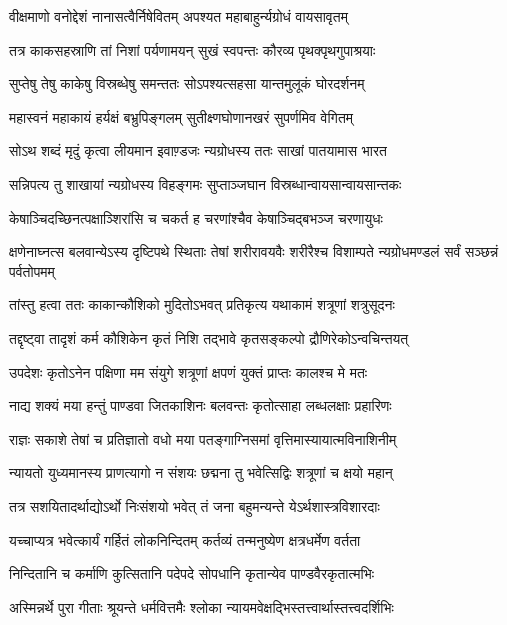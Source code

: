 \twolineshloka
{वीक्षमाणो वनोद्देशं नानासत्वैर्निषेवितम्}
{अपश्यत महाबाहुर्न्यग्रोधं वायसावृतम्}


\twolineshloka
{तत्र काकसहस्राणि तां निशां पर्यणामयन्}
{सुखं स्वपन्तः कौरव्य पृथक्पृथगुपाश्रयाः}


\twolineshloka
{सुप्तेषु तेषु काकेषु विस्रब्धेषु समन्ततः}
{सोऽपश्यत्सहसा यान्तमुलूकं घोरदर्शनम्}


\twolineshloka
{महास्वनं महाकायं हर्यक्षं बभ्रुपिङ्गलम्}
{सुतीक्ष्णघोणानखरं सुपर्णमिव वेगितम्}


\twolineshloka
{सोऽथ शब्दं मृदुं कृत्वा लीयमान इवाण़्डजः}
{न्यग्रोधस्य ततः साखां पातयामास भारत}


\twolineshloka
{सन्निपत्य तु शाखायां न्यग्रोधस्य विहङ्गमः}
{सुप्ताञ्जघान विस्रब्धान्वायसान्वायसान्तकः}


\twolineshloka
{केषाञ्चिदच्छिनत्पक्षाञ्शिरांसि च चकर्त ह}
{चरणांश्चैव केषाञ्चिद्बभञ्ज चरणायुधः}


क्षणेनाघ्नत्स बलवान्येऽस्य दृष्टिपथे स्थिताः
\twolineshloka
{तेषां शरीरावयवैः शरीरैश्च विशाम्पते}
{न्यग्रोधमण्डलं सर्वं सञ्छन्नं पर्वतोपमम्}


\twolineshloka
{तांस्तु हत्वा ततः काकान्कौशिको मुदितोऽभवत्}
{प्रतिकृत्य यथाकामं शत्रूणां शत्रुसूदनः}


\twolineshloka
{तद्दृष्ट्वा तादृशं कर्म कौशिकेन कृतं निशि}
{तद्भावे कृतसङ्कल्पो द्रौणिरेकोऽन्वचिन्तयत्}


\twolineshloka
{उपदेशः कृतोऽनेन पक्षिणा मम संयुगे}
{शत्रूणां क्षपणं युक्तं प्राप्तः कालश्च मे मतः}


\twolineshloka
{नाद्य शक्यं मया हन्तुं पाण्डवा जितकाशिनः}
{बलवन्तः कृतोत्साहा लब्धलक्षाः प्रहारिणः}


\twolineshloka
{राज्ञः सकाशे तेषां च प्रतिज्ञातो वधो मया}
{पतङ्गाग्निसमां वृत्तिमास्यायात्मविनाशिनीम्}


\twolineshloka
{न्यायतो युध्यमानस्य प्राणत्यागो न संशयः}
{छद्मना तु भवेत्सिद्विः शत्रूणां च क्षयो महान्}


\twolineshloka
{तत्र सशयितादर्थाद्योऽर्थो निःसंशयो भवेत्}
{तं जना बहुमन्यन्ते येऽर्थशास्त्रविशारदाः}


\twolineshloka
{यच्चाप्यत्र भवेत्कार्यं गर्हितं लोकनिन्दितम्}
{कर्तव्यं तन्मनुष्येण क्षत्रधर्मेण वर्तता}


\twolineshloka
{निन्दितानि च कर्माणि कुत्सितानि पदेपदे}
{सोपधानि कृतान्येव पाण्डवैरकृतात्मभिः}


\twolineshloka
{अस्मिन्नर्थे पुरा गीताः श्रूयन्ते धर्मवित्तमैः}
{श्लोका न्यायमवेक्षद्भिस्तत्त्वार्थास्तत्त्वदर्शिभिः}


